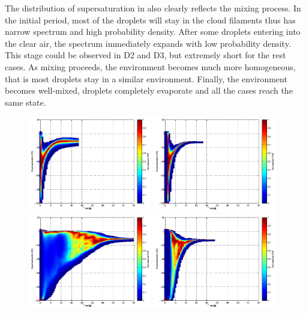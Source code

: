 \documentclass[draft,jgrga]{AGUTeX}
\begin{document}
\begin{article}
The distribution of supersaturation in  also clearly reflects the mixing process. In the initial period, most of the droplets will stay in the cloud filaments thus has narrow spectrum and high probability density. After some droplets entering into the clear air, the spectrum immediately expands with low probability density. This stage could be observed in D2 and D3, but extremely short for the rest cases. As mixing proceeds, the environment becomes much more homogeneous, that is most droplets stay in a similar environment. Finally, the environment becomes well-mixed, droplets completely evaporate and all the cases reach the same state.
\begin{figure}[H]\centering
\includegraphics[width=0.48\textwidth]{Figures/pdf_supersat_d1}
\includegraphics[width=0.48\textwidth]{Figures/pdf_supersat_f1}\\
\includegraphics[width=0.48\textwidth]{Figures/pdf_supersat_d2}
\includegraphics[width=0.48\textwidth]{Figures/pdf_supersat_f2}\\

\end{figure}
\end{article}
\end{document}
